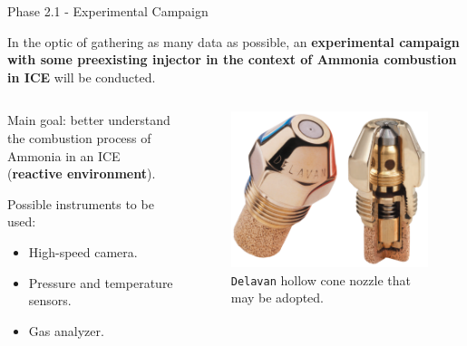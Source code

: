 \begin{frame}{Phase 2.1 - Experimental Campaign}

    In the optic of gathering as many data as possible, an \textbf{experimental campaign with some preexisting injector in the context of Ammonia combustion in ICE} will be conducted.

    \vspace{9pt}

    \begin{columns}[c, onlytextwidth]

        \begin{column}{0.6\textwidth}

            Main goal: better understand the combustion process of Ammonia in an ICE (\textbf{reactive environment}).

            \vspace{9pt}

            Possible instruments to be used:

            \begin{itemize}
                \item High-speed camera.
                \item Pressure and temperature sensors.
                \item Gas analyzer.
            \end{itemize}

        \end{column}

        \begin{column}{0.4\textwidth}

            \begin{figure}
                \centering
                \includegraphics[width=0.9\columnwidth]{img/Delavan-nozzle.png}
                \caption{\texttt{Delavan} hollow cone nozzle that may be adopted.}
            \end{figure}

        \end{column}

    \end{columns}

\end{frame}



